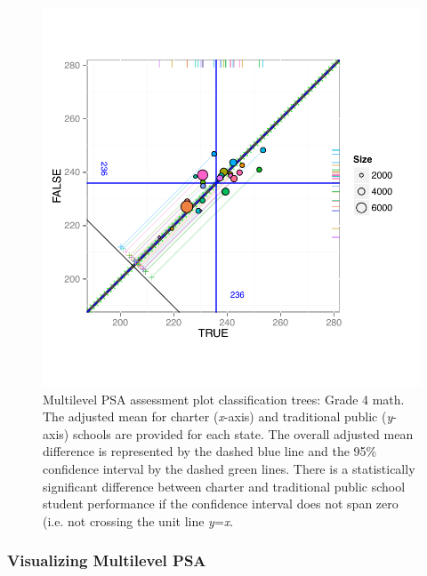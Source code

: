 \documentclass[letterpaper,12p,twoside]{article} %
\begin{document}
\setlength{\belowcaptionskip}{-15pt}
\begin{figure}[t!]
\begin{center}
\includegraphics[width=\textwidth,trim=0 .1in 0 .5in]{../Figures2009/g4math-mlpsa-ctree-circ.pdf}
\caption[Multilevel PSA assessment plot classification trees: Grade 4 math]{Multilevel PSA assessment plot classification trees: Grade 4 math. The adjusted mean for charter (\textit{x}-axis) and traditional public (\textit{y}-axis) schools are provided for each state. The overall adjusted mean difference is represented by the dashed blue line and the 95\% confidence interval by the dashed green lines. There is a statistically significant difference between charter and traditional public school student performance if the confidence interval does not span zero (i.e. not crossing the unit line \textit{y}=\textit{x}.}
\label{fig:g4math-mlpsa-ctree}
\end{center}
\end{figure}
\setlength{\belowcaptionskip}{0pt}

\subsubsection{Visualizing Multilevel PSA}
\end{document}
